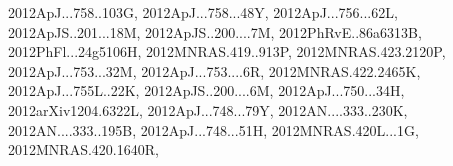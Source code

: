 \documentclass[12pt]{article}
\begin{document}
\begin{description}
{2012ApJ...758..103G,%
2012ApJ...758...48Y,%
2012ApJ...756...62L,%
2012ApJS..201...18M,%
2012ApJS..200....7M,%
2012PhRvE..86a6313B,%
2012PhFl...24g5106H,%
2012MNRAS.419..913P,%
2012MNRAS.423.2120P,%
2012ApJ...753...32M,%
2012ApJ...753....6R,%
2012MNRAS.422.2465K,%
2012ApJ...755L..22K,%
2012ApJS..200....6M,%
2012ApJ...750...34H,%
2012arXiv1204.6322L,%
2012ApJ...748...79Y,%
2012AN....333..230K,%
2012AN....333..195B,%
2012ApJ...748...51H,%
2012MNRAS.420L...1G,%
2012MNRAS.420.1640R,%
}
\end{description}
\end{document}
